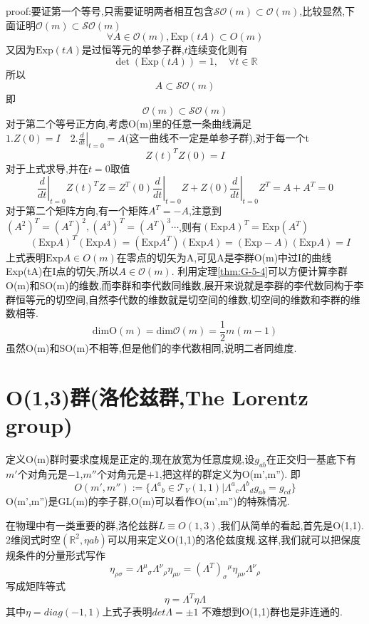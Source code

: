 \documentclass[../main.tex]{subfiles}
\begin{document}
 proof:要证第一个等号,只需要证明两者相互包含$\mathscr{SO}(m)\subset \mathscr{O}(m)$,比较显然,下面证明$\mathscr{O}(m)\subset\mathscr{SO}(m)$
 $$\forall A \in \mathscr{O}(m),\text{Exp}(tA) \subset O(m)$$
 又因为$\text{Exp}(tA)$是过恒等元的单参子群,$t$连续变化则有
 $$\det(\text{Exp}(tA)) = 1,\quad \forall t\in \mathbb{R}$$
 所以 $$A \subset \mathscr{SO}(m)$$
 即$$\mathscr{O}(m)\subset\mathscr{SO}(m)$$
 对于第二个等号正方向,考虑O(m)里的任意一条曲线满足$1.Z(0) = I \quad 2. \left.\frac{d}{dt}\right|_{t = 0}=A$(这一曲线不一定是单参子群),对于每一个t
 $$Z(t)^TZ(0)= I$$
 对于上式求导,并在$t = 0$取值
 $$\left.\frac{d}{dt}\right|_{t=0}Z(t)^TZ =Z^T(0) \left.\frac{d}{dt}\right|_{t=0}Z+ Z(0) \left.\frac{d}{dt}\right|_{t=0}Z^T = A + A^T = 0$$
 对于第二个矩阵方向,有一个矩阵$A^T = -A$,注意到$(A^2)^T = (A^T)^2,(A^3)^T = (A^T)^3\cdots $,则有$(\text{Exp}A)^T=\text{Exp}(A^T)$
 $$\quad (\text{Exp}A)^T (\text{Exp}A)=(\text{Exp}A^T)(\text{Exp}A) = (\text{Exp}-A)(\text{Exp}A)=I$$
 上式表明$\text{Exp}A\in O(m)$在零点的切矢为A,可见A是李群O(m)中过I的曲线Exp(tA)在I点的切矢,所以$A\in\mathscr{O}(m)$.
 利用定理\ref{thm:G-5-4}可以方便计算李群O(m)和SO(m)的维数,而李群和李代数同维数,展开来说就是李群的李代数同构于李群恒等元的切空间,自然李代数的维数就是切空间的维数,切空间的维数和李群的维数相等.
 $$\text{dimO}(m) = \text{dim}\mathscr{O}(m) = \frac{1}{2}m(m-1)$$
 虽然O(m)和SO(m)不相等,但是他们的李代数相同,说明二者同维度.
 \section{O(1,3)群(洛伦兹群,The Lorentz group)}
 定义O(m)群时要求度规是正定的,现在放宽为任意度规,设$g_{ab}$在正交归一基底下有$m'$个对角元是$-1$,$m''$个对角元是$+1$,把这样的群定义为O(m',m'').
 即$$O(m',m''):=\{\Lambda^a{}_b \in \mathscr{T}_V(1,1)|\Lambda^a{}_c\Lambda^b{}_d g_{ab} = g_{cd}\}$$
 O(m',m'')是GL(m)的李子群,O(m)可以看作O(m',m'')的特殊情况.

 在物理中有一类重要的群,洛伦兹群$L \equiv O(1,3)$,我们从简单的看起,首先是O(1,1).
 2维闵式时空$(\mathbb{R}^2,\eta{ab})$可以用来定义O(1,1)的洛伦兹度规.这样,我们就可以把保度规条件的分量形式写作
 $$\eta_{\rho\sigma} = \Lambda^\mu{}_\sigma \Lambda^\nu{}_\rho \eta_{\mu\nu} = (\Lambda^T)_\sigma{}^\mu\eta_{\mu\nu}\Lambda^\nu{}_\rho $$
 写成矩阵等式
 \begin{equation}
     \eta = \Lambda^T \eta \Lambda
     \label{洛伦兹保度规等式}
 \end{equation}其中$\eta = diag(-1,1)$上式子表明$det \Lambda = \pm 1$
 不难想到O(1,1)群也是非连通的.
\end{document}
